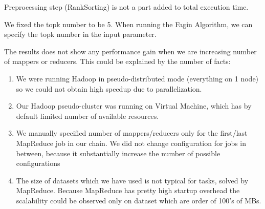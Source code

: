 \documentclass[a4paper]{article}
\begin{document}
Preprocessing step (RankSorting) is not a part added to total execution time.

We fixed the topk number to be 5. When running the Fagin Algorithm, we can specify the topk number in the input parameter.

\begin{table}[htbp]
    \caption{Top 5 objects from hadoop}
    \noindent{}
\end{table}

The results does not show any performance gain when we are increasing number of mappers or reducers.
This could be explained by the number of facts:
\begin{enumerate}
    \item We were running Hadoop in pseudo-distributed mode (everything on 1 node) so we could not obtain high speedup due to parallelization.
    \item Our Hadoop pseudo-cluster was running on Virtual Machine, which has by default limited number of available resources.
    \item We manually specified number of mappers/reducers only for the first/last MapReduce job in our chain. We did not change configuration for jobs in between, because it substantially increase the number of possible configurations
    \item The size of datasets which we have used is not typical for tasks, solved by MapReduce. Because MapReduce has pretty high startup overhead the scalability could be observed only on dataset which are order of 100's of MBs.
\end{enumerate}
\end{document}
